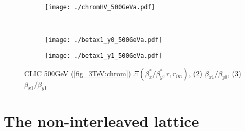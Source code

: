 \begin{figure}
\begin{subfigure}{1.0\textwidth}
 \texttt{[image: ./chromHV\_500GeVa.pdf]}\caption{}\label{fig_chrom:b}
 \end{subfigure}\\
 \begin{subfigure}{0.5\textwidth}
 \texttt{[image: ./betax1\_y0\_500GeVa.pdf]}\caption{}\label{fig_500GeV:bx1_y0}
 \end{subfigure}
  \begin{subfigure}{0.5\textwidth}
 \texttt{[image: ./betax1\_y1\_500GeVa.pdf]}\caption{}\label{fig_500GeV:bx1_y1}
 \end{subfigure}
 \caption{CLIC 500GeV (\ref{fig_3TeV:chrom}) $\Xi(\beta^*_x/\beta^*_y,r,r_{im})$, (\ref{fig_500GeV:bx1_y0}) $\beta_{x1}/\beta_{y0}$, (\ref{fig_500GeV:bx1_y1}) $\beta_{x1}/\beta_{y1}$}\label{f:fig_500GeV}
\end{figure}
\clearpage

\section{The non-interleaved lattice}\label{s:noninterleaved}
